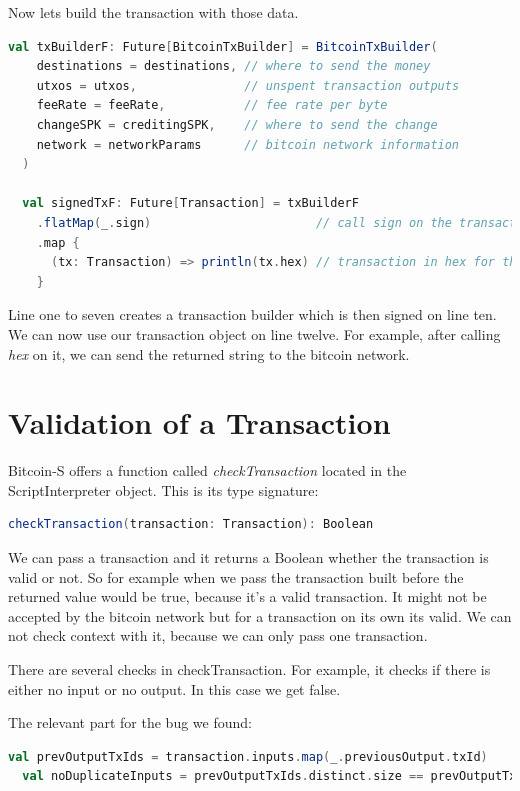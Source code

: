 Now lets build the transaction with those data.
\begin{lstlisting}[language=scala]
  val txBuilderF: Future[BitcoinTxBuilder] = BitcoinTxBuilder(
    destinations = destinations, // where to send the money
    utxos = utxos,               // unspent transaction outputs
    feeRate = feeRate,           // fee rate per byte
    changeSPK = creditingSPK,    // where to send the change
    network = networkParams      // bitcoin network information
  )

  val signedTxF: Future[Transaction] = txBuilderF
    .flatMap(_.sign)                       // call sign on the transaction builder
    .map {
      (tx: Transaction) => println(tx.hex) // transaction in hex for the bitcoin network
    }
\end{lstlisting}

Line one to seven creates a transaction builder which is then signed on line ten.
We can now use our transaction object on line twelve.
For example, after calling \emph{hex} on it, we can send the returned string to the bitcoin network.


\section{Validation of a Transaction}

Bitcoin-S offers a function called \emph{checkTransaction} located in the ScriptInterpreter object.
This is its type signature:
\begin{lstlisting}[language=scala]
  checkTransaction(transaction: Transaction): Boolean
\end{lstlisting}

We can pass a transaction and it returns a Boolean whether the transaction is valid or not.
So for example when we pass the transaction built before the returned value would be true, because it's a valid transaction.
It might not be accepted by the bitcoin network but for a transaction on its own its valid.
We can not check context with it, because we can only pass one transaction.

There are several checks in checkTransaction.
For example, it checks if there is either no input or no output.
In this case we get false.

The relevant part for the bug we found:
\begin{lstlisting}[language=scala]
  val prevOutputTxIds = transaction.inputs.map(_.previousOutput.txId)
  val noDuplicateInputs = prevOutputTxIds.distinct.size == prevOutputTxIds.size
\end{lstlisting}


